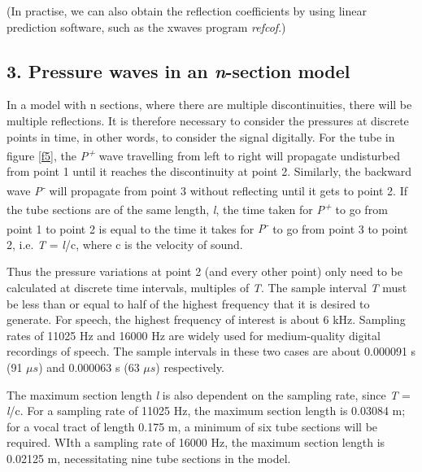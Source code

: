 \bigskip

(In practise, we can also obtain the reflection coefficients by using linear prediction software, such as the xwaves program \textit{refcof}.)

\bigskip

\subsection*{3. Pressure waves in an \textit{n}-section model}

In a model with n sections, where there are multiple discontinuities, there will be multiple reflections. It is therefore necessary to consider the pressures at discrete points in time, in other words, to consider the signal digitally. For the tube in figure \ref{f5}, the \textit{P\textsuperscript{+}} wave travelling from left to right will propagate undisturbed from point 1 until it reaches the discontinuity at point 2. Similarly, the backward wave \textit{P\textsuperscript{-}} will propagate from point 3 without reflecting until it gets to point 2. If the tube sections are of the same length, \textit{l}, the time taken for \textit{P\textsuperscript{+}} to go from point 1 to point 2 is equal to the time it takes for \textit{P\textsuperscript{-}} to go from point 3 to point 2, i.e. \textit{T} = \textit{l}/c, where c is the velocity of sound.

\bigskip

Thus the pressure variations at point 2 (and every other point) only need to be calculated at discrete time intervals, multiples of \textit{T}. The sample interval \textit{T} must be less than or equal to half of the highest frequency that it is desired to generate. For speech, the highest frequency of interest is about 6 kHz. Sampling rates of 11025 Hz and 16000 Hz are widely used for medium-quality digital recordings of speech. The sample intervals in these two cases are about 0.000091 s (91 $\mu s$) and 0.000063 s (63 $\mu s$) respectively.

\bigskip

The maximum section length \textit{l} is also dependent on the sampling rate, since \textit{T} = \textit{l}/c. For a sampling rate of 11025 Hz, the maximum section length is 0.03084 m; for a vocal tract of length 0.175 m, a minimum of six tube sections will be required. WIth a sampling rate of 16000 Hz, the maximum section length is 0.02125 m, necessitating nine tube sections in the model.

\bigskip


